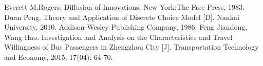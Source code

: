 \documentclass[12pt]{article}
\begin{document}
	
	
	\newpage
	\tableofcontents
	
	
	
	
	
	
	
	
	
	
	
	
	
	
	
	
	
	
	
	
	\addtocounter{section}{1}
	\begin{thebibliography}{99}
		 Everett M.Rogers. Diffusion of Innovations. New York:The Free Press, 1983.
		 Duan Peng. Theory and Application of Discrete Choice Model [D]. Nankai University, 2010.
		Addison-Wesley Publishing Company, 1986.
		 Feng Jiandong, Wang Hao. Investigation and Analysis on the Characteristics and Travel Willingness of Bus Passengers in Zhengzhou City [J]. Transportation Technology and Economy, 2015, 17(04): 64-70.
	\end{thebibliography}
	
	
	
	
	
	
	
\end{document}
